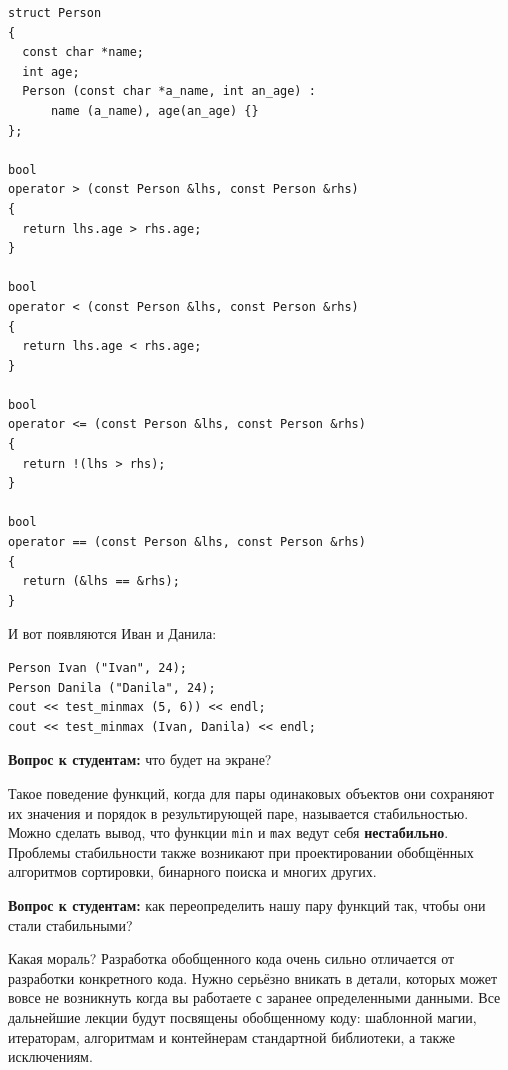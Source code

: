 \documentclass[a4paper,12pt,oneside]{article}
\newif\ifanswers
\begin{document}
\begin{lstlisting}
struct Person
{
  const char *name;
  int age;
  Person (const char *a_name, int an_age) : 
      name (a_name), age(an_age) {}
};

bool
operator > (const Person &lhs, const Person &rhs)
{
  return lhs.age > rhs.age;
}

bool
operator < (const Person &lhs, const Person &rhs)
{
  return lhs.age < rhs.age;
}

bool
operator <= (const Person &lhs, const Person &rhs)
{
  return !(lhs > rhs);
}

bool
operator == (const Person &lhs, const Person &rhs)
{
  return (&lhs == &rhs);
}
\end{lstlisting}

И вот появляются Иван и Данила:

\begin{lstlisting}
Person Ivan ("Ivan", 24);
Person Danila ("Danila", 24);
cout << test_minmax (5, 6)) << endl;
cout << test_minmax (Ivan, Danila) << endl;
\end{lstlisting}

\textbf{Вопрос к студентам:} что будет на экране?

\ifanswers
Правильный ответ: неожиданно на экране будет 1 и 0. 
\fi

Такое поведение функций, когда для пары одинаковых объектов они сохраняют их значения и порядок в результирующей паре, называется стабильностью. Можно сделать вывод, что функции \lstinline!min! и \lstinline!max! ведут себя \textbf{нестабильно}. Проблемы стабильности также возникают при проектировании обобщённых алгоритмов сортировки, бинарного поиска и многих других.

\textbf{Вопрос к студентам:} как переопределить нашу пару функций так, чтобы они стали стабильными?

\ifanswers
Один из вариантов решения

\begin{lstlisting}
template <class T> const T&
max (const T &x, const T &y)
{
  return ((x > y) ? x : y);
}

template <class T> const T&
min (const T &x, const T &y)
{
  return ((x <= y) ? x : y);
}
\end{lstlisting}
\fi

Какая мораль? Разработка обобщенного кода очень сильно отличается от разработки конкретного кода. Нужно серьёзно вникать в детали, которых может вовсе не возникнуть когда вы работаете с заранее определенными данными. Все дальнейшие лекции будут посвящены обобщенному коду: шаблонной магии, итераторам, алгоритмам и контейнерам стандартной библиотеки, а также исключениям. 
\end{document}
